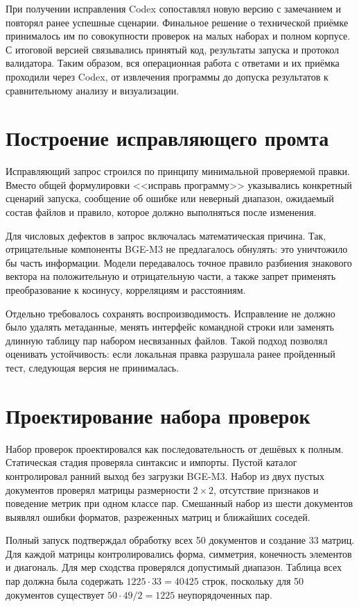 \documentclass[a4paper,12pt]{extreport}
\begin{document}
При получении исправления Codex сопоставлял новую версию с замечанием и повторял ранее успешные сценарии. Финальное решение о технической приёмке принималось им по совокупности проверок на малых наборах и полном корпусе. С итоговой версией связывались принятый код, результаты запуска и протокол валидатора. Таким образом, вся операционная работа с ответами и их приёмка проходили через Codex, от извлечения программы до допуска результатов к сравнительному анализу и визуализации.

\section{Построение исправляющего промта}

Исправляющий запрос строился по принципу минимальной проверяемой правки. Вместо общей формулировки <<исправь программу>> указывались конкретный сценарий запуска, сообщение об ошибке или неверный диапазон, ожидаемый состав файлов и правило, которое должно выполняться после изменения.

Для числовых дефектов в запрос включалась математическая причина. Так, отрицательные компоненты BGE-M3 не предлагалось обнулять: это уничтожило бы часть информации. Модели передавалось точное правило разбиения знакового вектора на положительную и отрицательную части, а также запрет применять преобразование к косинусу, корреляциям и расстояниям.

Отдельно требовалось сохранять воспроизводимость. Исправление не должно было удалять метаданные, менять интерфейс командной строки или заменять длинную таблицу пар набором несвязанных файлов. Такой подход позволял оценивать устойчивость: если локальная правка разрушала ранее пройденный тест, следующая версия не принималась.

\section{Проектирование набора проверок}

Набор проверок проектировался как последовательность от дешёвых к полным. Статическая стадия проверяла синтаксис и импорты. Пустой каталог контролировал ранний выход без загрузки BGE-M3. Набор из двух пустых документов проверял матрицы размерности $2\times2$, отсутствие признаков и поведение метрик при одном классе пар. Смешанный набор из шести документов выявлял ошибки форматов, разреженных матриц и ближайших соседей.

Полный запуск подтверждал обработку всех 50 документов и создание 33 матриц. Для каждой матрицы контролировались форма, симметрия, конечность элементов и диагональ. Для мер сходства проверялся допустимый диапазон. Таблица всех пар должна была содержать $1225\cdot33=40425$ строк, поскольку для 50 документов существует $50\cdot49/2=1225$ неупорядоченных пар.
\end{document}
